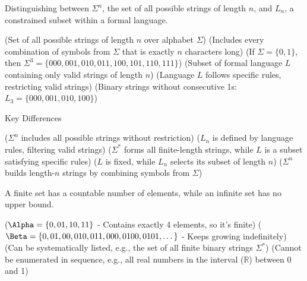 \begin{NxSSSSBox}
	\begin{NxIDBox}
		Distinguishing between $\Sigma^n$, the set of all possible strings of length $n$, and $L_n$, a constrained subset within a formal language.
		\begin{NxListDark}
			 (Set of all possible strings of length $n$ over alphabet $\Sigma$)
			 (Includes every combination of symbols from $\Sigma$ that is exactly $n$ characters long)
			 (If $\Sigma = \{0,1\}$, then $\Sigma^3 = \{000, 001, 010, 011, 100, 101, 110, 111\}$)
			 (Subset of formal language $L$ containing only valid strings of length $n$)
			 (Language $L$ follows specific rules, restricting valid strings)
			 (Binary strings without consecutive 1s: $L_3 = \{000, 001, 010, 100\}$)
		\end{NxListDark}
	\end{NxIDBox}
	\begin{NxIDBox}
		Key Differences
		\begin{NxListDark}
			 ($\Sigma^n$ includes all possible strings without restriction)
			 ($L_n$ is defined by language rules, filtering valid strings)
			 ($\Sigma^*$ forms all finite-length strings, while $L$ is a subset satisfying specific rules)
			 ($L$ is fixed, while $L_n$ selects its subset of length $n$)
			 ($\Sigma^n$ builds length-$n$ strings by combining symbols from $\Sigma$)
		\end{NxListDark}
	\end{NxIDBox}
\end{NxSSSSBox}


\begin{NxSSSSBox}
	\begin{NxIDBox}
		A finite set has a countable number of elements, while an infinite set has no upper bound.
		\begin{NxListDark}
			 ($\Alpha = \{0, 01, 10, 11\}$ - Contains exactly 4 elements, so it's finite)
			 ($\Beta = \{0, 01, 00, 010, 011, 000, 0100, 0101, \dots \}$ - Keeps growing indefinitely)
			 (Can be systematically listed, e.g., the set of all finite binary strings $\Sigma^*$)
			 (Cannot be enumerated in sequence, e.g., all real numbers in the interval ($\mathbb{R}$) between 0 and 1)
		\end{NxListDark}
	\end{NxIDBox}
\end{NxSSSSBox}


